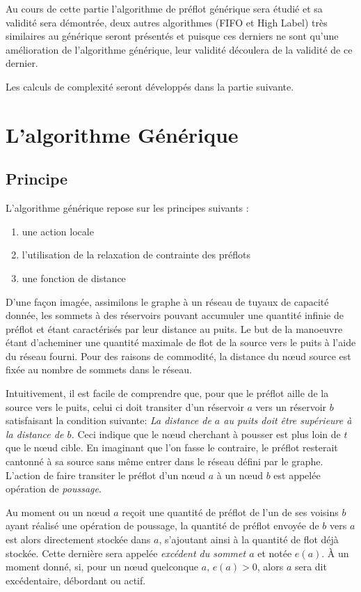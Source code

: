 Au cours de cette partie l'algorithme de préflot générique sera étudié et sa validité sera
démontrée, deux autres algorithmes (FIFO et High Label) très similaires au générique seront
présentés et puisque ces derniers ne sont qu'une amélioration de l'algorithme générique, leur
validité découlera de la validité de ce dernier.

Les calculs de complexité seront développés dans la partie suivante.

\section{L'algorithme Générique}

\subsection{Principe}

L'algorithme générique repose sur les principes suivants :
\begin{enumerate}
	\item une action locale
	\item l'utilisation de la relaxation de contrainte des préflots
	\item une fonction de distance
\end{enumerate}

D'une façon imagée, assimilons le graphe à un réseau de tuyaux de capacité donnée, les sommets à des
réservoirs pouvant accumuler une quantité infinie de préflot et étant caractérisés par leur distance au
puits. Le but de la manoeuvre étant d'acheminer une quantité maximale de flot de la source vers le
puits à l'aide du réseau fourni. Pour des raisons de commodité, la distance du n\oe ud source est fixée
au nombre de sommets dans le réseau. 

Intuitivement, il est facile de comprendre que, pour que le préflot aille de la source vers le puits,
celui ci doit transiter d'un réservoir $a$ vers un réservoir $b$ satisfaisant la condition suivante:
\emph{La distance de $a$ au puits doit être supérieure à la distance de $b$.} Ceci indique que le
n\oe ud cherchant à pousser est plus loin de $t$ que le n\oe ud cible.  En imaginant que l'on
fasse le contraire, le préflot resterait cantonné à sa source sans même entrer dans le réseau défini
par le graphe. L'action de faire transiter le préflot d'un n\oe ud $a$ à un n\oe ud $b$ est appelée
opération de \emph{poussage}.

Au moment ou un n\oe ud $a$ reçoit une quantité de préflot de l'un de ses voisins $b$ ayant réalisé une
opération de poussage, la quantité de préflot envoyée de $b$ vers $a$ est alors directement stockée
dans $a$, s'ajoutant ainsi à la quantité de flot déjà stockée. Cette dernière sera appelée
\emph{excédent du sommet $a$} et notée $e(a)$. À un moment donné, si, pour un n\oe ud quelconque $a$,
$e(a) > 0$, alors $a$ sera dit excédentaire, débordant ou actif.

